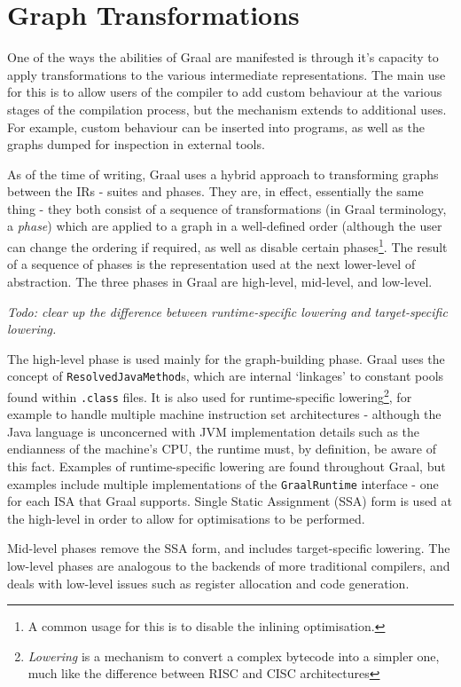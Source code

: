 \section{Graph Transformations} \label{sec:graal/transformations}
One of the ways the abilities of Graal are manifested is through it's capacity to apply transformations to the various intermediate representations. The main use for this is to allow users of the compiler to add custom behaviour at the various stages of the compilation process, but the mechanism extends to additional uses. For example, custom behaviour can be inserted into programs, as well as the graphs dumped for inspection in external tools.

As of the time of writing, Graal uses a hybrid approach to transforming graphs between the IRs - suites and phases. They are, in effect, essentially the same thing - they both consist of a sequence of transformations (in Graal terminology, a \textit{phase}) which are applied to a graph in a well-defined order (although the user can change the ordering if required, as well as disable certain phases\footnote{A common usage for this is to disable the inlining optimisation.}. The result of a sequence of phases is the representation used at the next lower-level of abstraction. The three phases in Graal are high-level, mid-level, and low-level.

{\small \textit{Todo: clear up the difference between runtime-specific lowering and target-specific lowering.}}

The high-level phase is used mainly for the graph-building phase. Graal uses the concept of \texttt{ResolvedJavaMethod}s, which are internal `linkages' to constant pools found within \texttt{.class} files. It is also used for runtime-specific lowering\footnote{\emph{Lowering} is a mechanism to convert a complex bytecode into a simpler one, much like the difference between RISC and CISC architectures}, for example to handle multiple machine instruction set architectures - although the Java language is unconcerned with JVM implementation details such as the endianness of the machine's CPU, the runtime must, by definition, be aware of this fact. Examples of runtime-specific lowering are found throughout Graal, but examples include multiple implementations of the \texttt{GraalRuntime} interface - one for each ISA that Graal supports. Single Static Assignment (SSA) form is used at the high-level in order to allow for optimisations to be performed.

Mid-level phases remove the SSA form, and includes target-specific lowering. The low-level phases are analogous to the backends of more traditional compilers, and deals with low-level issues such as register allocation and code generation.

